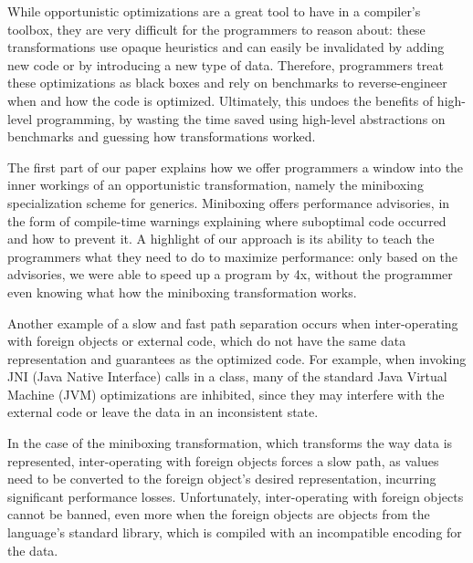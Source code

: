 While opportunistic optimizations are a great tool to have in a compiler's toolbox, they are very difficult for the programmers to reason about: these transformations use opaque heuristics and can easily be invalidated by adding new code or by introducing a new type of data. Therefore, programmers treat these optimizations as black boxes and rely on benchmarks to reverse-engineer when and how the code is optimized. Ultimately, this undoes the benefits of high-level programming, by wasting the time saved using high-level abstractions on benchmarks and guessing how transformations worked.

The first part of our paper explains how we offer programmers a window into the inner workings of an opportunistic transformation, namely the miniboxing specialization scheme for generics. Miniboxing offers performance advisories, in the form of compile-time warnings explaining where suboptimal code occurred and how to prevent it. A highlight of our approach is its ability to teach the programmers what they need to do to maximize performance: only based on the advisories, we were able to speed up a program by 4x, without the programmer even knowing what how the miniboxing transformation works.

Another example of a slow and fast path separation occurs when inter-operating with foreign objects or external code, which do not have the same data representation and guarantees as the optimized code. For example, when invoking JNI (Java Native Interface) calls in a class, many of the standard Java Virtual Machine (JVM) optimizations are inhibited, since they may interfere with the external code or leave the data in an inconsistent state.

In the case of the miniboxing transformation, which transforms the way data is represented, inter-operating with foreign objects forces a slow path, as values need to be converted to the foreign object's desired representation, incurring significant performance losses. Unfortunately, inter-operating with foreign objects cannot be banned, even more when the foreign objects are objects from the language's standard library, which is compiled with an incompatible encoding for the data.

